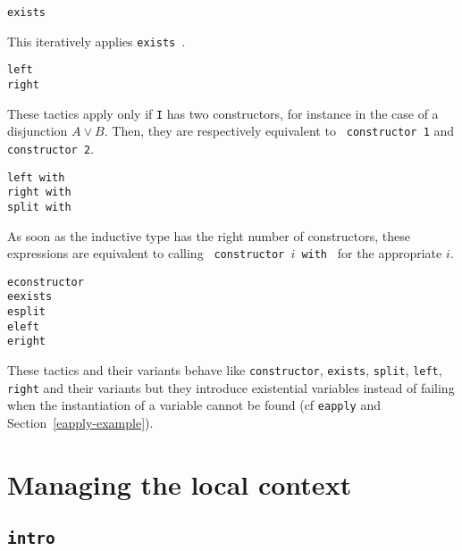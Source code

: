 \begin{coq_example*}
\begin{Variants}
\item {\tt exists \nelist{\bindinglist}{,}}

  This iteratively applies {\tt exists {\bindinglist}}.

\item {\tt left}\\
      {\tt right}

  These tactics apply only if {\tt I} has two constructors, for instance
  in the case of a
  disjunction $A\lor B$. Then, they are respectively equivalent to {\tt
    constructor 1} and {\tt constructor 2}.

  \ErrMsg {}

\item {\tt left with \bindinglist}\\
      {\tt right with \bindinglist}\\
      {\tt split with \bindinglist}

  As soon as the inductive type has the right number of constructors,
    these expressions are equivalent to calling {\tt
    constructor $i$ with \bindinglist} for the appropriate $i$.

\item \texttt{econstructor}\\
      \texttt{eexists}\\
      \texttt{esplit}\\
      \texttt{eleft}\\
      \texttt{eright}

  These tactics and their variants behave like \texttt{constructor},
  \texttt{exists}, \texttt{split}, \texttt{left}, \texttt{right} and
  their variants but they introduce existential variables instead of
  failing when the instantiation of a variable cannot be found (cf
  \texttt{eapply} and Section~\ref{eapply-example}).

\end{Variants}

\section{Managing the local context}

\subsection{\tt intro}
\label{intro}


\end{coq_example*}

